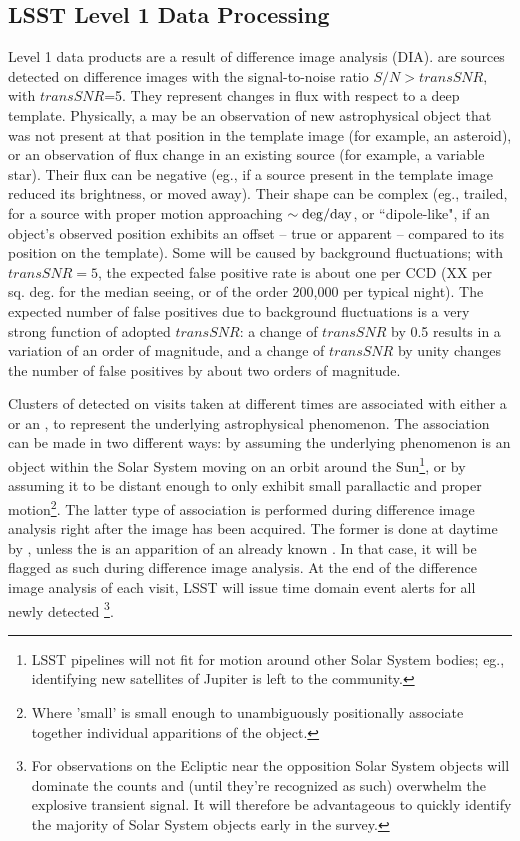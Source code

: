 \subsection{LSST Level 1 Data Processing} 

Level 1 data products are a result of difference image analysis (DIA). 
\DIASources are sources detected on difference images with the signal-to-noise ratio $S/N>transSNR$, 
with $transSNR$=5. 
They represent changes in flux with respect to a deep template. Physically, a \DIASource may be an observation of new astrophysical object that was not present at that position in the template image (for example, an asteroid), or an observation of flux change in an existing source (for example, a variable star). Their flux can be negative (eg., if a source present in the template image reduced its brightness, or moved away). Their shape can be complex (eg., trailed, for a source with proper motion approaching $\sim {\rm deg}/{\rm day}$, or ``dipole-like", if an object's observed position exhibits an offset -- true or apparent -- compared to its position on the template). 
Some \DIASources will be caused by background fluctuations; with $transSNR = 5$, 
the expected false positive rate is about one per CCD (XX per sq. deg. for the median seeing, 
or of the order 200,000 per typical night). 
The expected number of false positives due to background fluctuations is a very strong function 
of adopted $transSNR$: a change of $transSNR$ by 0.5
results in a variation of an order of magnitude, and a change of $transSNR$ by unity changes the number of false
positives by about two orders of magnitude.

Clusters of \DIASources detected on visits taken at different times are associated with either a \DIAObject or an \SSObject, to represent the underlying astrophysical phenomenon. The association can be made in two different ways: by assuming the underlying phenomenon is an object within the Solar System moving on an orbit around the Sun\footnote{LSST pipelines will not fit for motion around other Solar System bodies; eg., identifying new satellites of Jupiter is left to the community.}, or by assuming it to be distant enough to only exhibit small parallactic and proper motion\footnote{Where 'small' is small enough to unambiguously positionally associate together individual apparitions of the object.}. The latter type of association is performed during difference image analysis right after the image has been acquired. The former is done at daytime by , unless the \DIASource is an apparition of an already known \SSObject. In that case, it will be flagged as such during difference image analysis. At the end of the difference image analysis of each visit, LSST will issue time domain event alerts for all 
newly detected \DIASources\footnote{For observations on the Ecliptic near the opposition Solar System objects will dominate the \DIASource counts and (until they're recognized as such) overwhelm the explosive transient signal. It will therefore be advantageous to quickly identify the majority of Solar System objects early in the survey.}.

